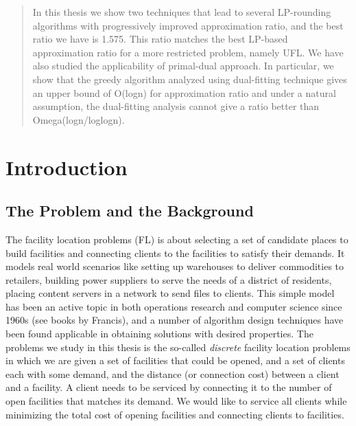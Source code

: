 \documentclass[oneside,final]{ucr}
\begin{document}
\begin{frontmatter}
\begin{abstract}
  In this thesis we show two techniques that lead to several LP-rounding
  algorithms with progressively improved approximation ratio, and the
  best ratio we have is 1.575. This ratio matches the best LP-based
  approximation ratio for a more restricted problem, namely UFL. We
  have also studied the applicability of primal-dual approach. In
  particular, we show that the greedy algorithm analyzed using
  dual-fitting technique gives an upper bound of O(logn) for
  approximation ratio and under a natural assumption, the dual-fitting
  analysis cannot give a ratio better than Omega(logn/loglogn).
\end{abstract}

\tableofcontents
\listoffigures
\listoftables

\end{frontmatter}

\chapter{Introduction} \label{ch: intro}

\section{The Problem and the Background}
The facility location problems (FL) is about selecting a set of
candidate places to build facilities and connecting clients to the
facilities to satisfy their demands. It models real world scenarios
like setting up warehouses to deliver commodities to retailers,
building power suppliers to serve the needs of a district of
residents, placing content servers in a network to send files to
clients. This simple model has been an active topic in both operations
research and computer science since 1960s (see books by Francis), and
a number of algorithm design techniques have been found applicable in
obtaining solutions with desired properties. The problems we study in
this thesis is the so-called \emph{discrete} facility location
problems in which we are given a set of facilities that could be
opened, and a set of clients each with some demand, and the distance
(or connection cost) between a client and a facility. A client needs
to be serviced by connecting it to the number of open facilities that
matches its demand. We would like to service all clients while
minimizing the total cost of opening facilities and connecting clients
to facilities.
\end{document}
